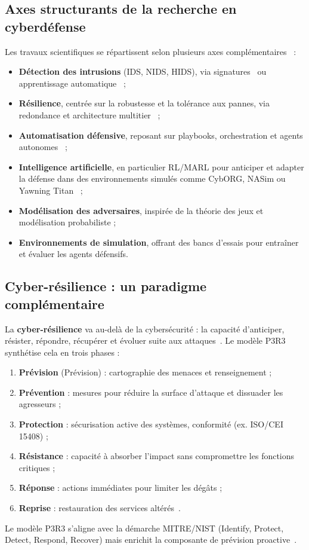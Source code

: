 \documentclass[ twoside,openright,titlepage,numbers=noenddot,headinclude,%
                footinclude=true,cleardoublepage=empty,abstractoff, %
                BCOR=5mm,paper=a4,fontsize=11pt,%
                french,american,%
                ]{scrreprt}
\begin{document}
\subsection*{Axes structurants de la recherche en cyberdéfense}

Les travaux scientifiques se répartissent selon plusieurs axes complémentaires~\cite{Buczak2016,Pawlick2019autodefense,Kim2020rlcyberdefense} :
\begin{itemize}
  \item \textbf{Détection des intrusions} (IDS, NIDS, HIDS), via signatures~\cite{Axelsson2000} ou apprentissage automatique~\cite{Sommer2010,Buczak2016} ;
  \item \textbf{Résilience}, centrée sur la robustesse et la tolérance aux pannes, via redondance et architecture multitier~\cite{Bodeau2011,MITRECyberResilience2020} ;
  \item \textbf{Automatisation défensive}, reposant sur playbooks, orchestration et agents autonomes~\cite{Pawlick2019autodefense} ;
  \item \textbf{Intelligence artificielle}, en particulier RL/MARL pour anticiper et adapter la défense dans des environnements simulés comme CybORG, NASim ou Yawning Titan~\cite{CybORG2021,Ghanem2021NASim,YawningTitan2022} ;
  \item \textbf{Modélisation des adversaires}, inspirée de la théorie des jeux et modélisation probabiliste ;
  \item \textbf{Environnements de simulation}, offrant des bancs d’essais pour entraîner et évaluer les agents défensifs.
\end{itemize}

\subsection*{Cyber-résilience : un paradigme complémentaire}

La \textbf{cyber-résilience} va au-delà de la cybersécurité : la capacité d’anticiper, résister, répondre, récupérer et évoluer suite aux attaques~\cite{NISTresilience}. Le modèle P3R3~\cite{Theron2013P3R3} synthétise cela en trois phases :

\begin{enumerate}
  \item \textbf{Prévision} (Prévision) : cartographie des menaces et renseignement ;
  \item \textbf{Prévention} : mesures pour réduire la surface d’attaque et dissuader les agresseurs ;
  \item \textbf{Protection} : sécurisation active des systèmes, conformité (ex. ISO/CEI 15408) ;
  \item \textbf{Résistance} : capacité à absorber l’impact sans compromettre les fonctions critiques ;
  \item \textbf{Réponse} : actions immédiates pour limiter les dégâts ;
  \item \textbf{Reprise} : restauration des services altérés~\cite{Theron2013P3R3}.
\end{enumerate}
Le modèle P3R3 s’aligne avec la démarche MITRE/NIST (Identify, Protect, Detect, Respond, Recover) mais enrichit la composante de prévision proactive~\cite{Theron2013P3R3}.
\end{document}
